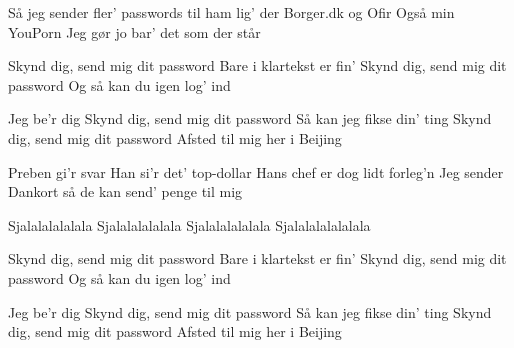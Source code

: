 \documentclass[a4paper,11pt]{article}
\begin{document}
\begin{song}
%
Så jeg sender fler'
passwords til ham lig' der 
Borger.dk og Ofir
Også min YouPorn
Jeg gør jo bar' det som der står


%
Skynd dig, send mig dit password
Bare i klartekst er fin'
Skynd dig, send mig dit password
Og så kan du igen log' ind

%
Jeg be'r dig
Skynd dig, send mig dit password
Så kan jeg fikse din' ting
Skynd dig, send mig dit password
Afsted til mig her i Beijing


%
Preben gi'r svar
Han si'r det' top-dollar
Hans chef er dog lidt forleg'n
%
Jeg sender Dankort
så de kan send' penge til mig


%
Sjalalalalalala
Sjalalalalalala
Sjalalalalalala
Sjalalalalalalala

%
Skynd dig, send mig dit password
Bare i klartekst er fin'
Skynd dig, send mig dit password
Og så kan du igen log' ind

%
Jeg be'r dig
Skynd dig, send mig dit password
Så kan jeg fikse din' ting
Skynd dig, send mig dit password
Afsted til mig her i Beijing

\end{song}
\end{document}

